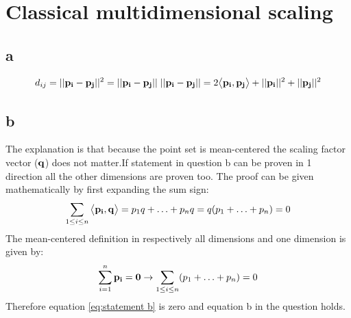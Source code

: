 \documentclass[a4paper,12pt]{article}
\begin{document}
\section{Classical multidimensional scaling}
\subsection{a}

\begin{equation}
\begin{aligned}
d_{ij}=||{\bf p_i-p_j}||^2=||{\bf p_i-p_j}||\;||{\bf p_i-p_j}||=2\big \langle{\bf p_i,p_j}\big \rangle+||{\bf p_i}||^2+||{\bf p_j}||^2
\end{aligned}
\end{equation}

\subsection{b}
The explanation is that because the point set is mean-centered the scaling factor vector (${\bf q}$) does not matter.If statement in question b can be proven in 1 direction all the other dimensions are proven too. The proof can be given mathematically by first expanding the sum sign:
\begin{equation}
\begin{aligned}
\sum_{1\leq i \leq n} \big \langle{\bf p_i,q}\big \rangle=p_{1}q+\ldots+p_{n}q=q(p_1+\ldots +p_n)=0
\end{aligned}
\label{eq:statement b}
\end{equation}
The mean-centered definition in respectively all dimensions and one dimension is given by:
\begin{equation}
\begin{aligned}
\sum_{i=1}^n {\bf p_i}={\bf 0 } \rightarrow \sum_{1 \leq i \leq n} (p_1+\ldots +p_n)=0
\end{aligned}
\end{equation}
Therefore equation \ref{eq:statement b} is zero and equation b in the question holds.
\end{document}
